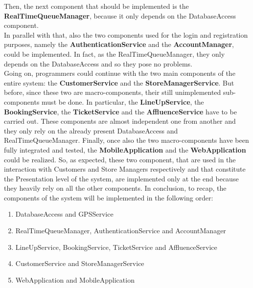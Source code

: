 Then, the next component that should be implemented is the \textbf{RealTimeQueueManager}, because it only depends on the DatabaseAccess component.	\\
In parallel with that, also the two components used for the login and registration purposes, namely the \textbf{AuthenticationService} and the \textbf{AccountManager}, could be implemented. In fact, as the RealTimeQueueManager, they only depends on the DatabaseAccess and so they pose no problems.	 \\
Going on, programmers could continue with the two main components of the entire system: the \textbf{CustomerService} and the \textbf{StoreManagerService}. But before, since these two are macro-components, their still unimplemented sub-components must be done. In particular, the \textbf{LineUpService}, the \textbf{BookingService}, the \textbf{TicketService} and the \textbf{AffluenceService} have to be carried out. These components are almost independent one from another and they only rely on the already present DatabaseAccess and RealTimeQueueManager.
Finally, once also the two macro-components have been fully integrated and tested, the \textbf{MobileApplication} and the \textbf{WebApplication} could be realized. So, as expected, these two component, that are used in the interaction with Customers and Store Managers respectively and that constitute the Presentation level of the system, are implemented only at the end because they heavily rely on all the other components.
In conclusion, to recap, the components of the system will be implemented in the following order:
\begin{enumerate}
	\item DatabaseAccess and GPSService
	\item RealTimeQueueManager, AuthenticationService and AccountManager
	\item LineUpService, BookingService, TicketService and AffluenceService
	\item CustomerService and StoreManagerService
	\item WebApplication and MobileApplication
\end{enumerate}


